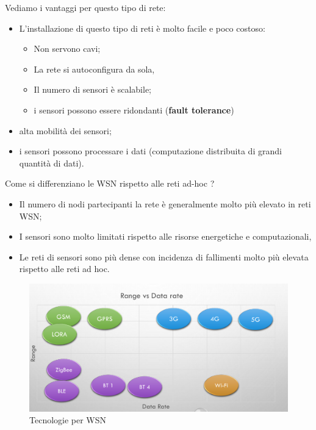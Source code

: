 \documentclass[12pt]{article}
\begin{document}
    		Vediamo i vantaggi per questo tipo di rete:
    		\begin{itemize}
    			\item L'installazione di questo tipo di reti è molto facile e poco costoso:
    			\begin{itemize}
    				\item Non servono cavi;
    				\item La rete si autoconfigura da sola,
    				\item Il numero di sensori è scalabile;
    				\item i sensori possono essere ridondanti (\textbf{fault tolerance})
    			\end{itemize}
    			\item alta mobilità dei sensori;
    			\item i sensori possono processare i dati (computazione distribuita di grandi quantità di dati).
    		\end{itemize}
    		Come si differenziano le WSN rispetto alle reti ad-hoc ?
    		\begin{itemize}
    			\item Il numero di nodi partecipanti la rete è generalmente molto più elevato in reti WSN;
    			\item I sensori sono molto limitati rispetto alle risorse energetiche e computazionali,
    			\item Le reti di sensori sono più dense con incidenza di fallimenti molto più elevata rispetto alle reti ad hoc.	
    		\end{itemize}
    		\begin{figure}[h!]
    			\centering
    			\includegraphics[scale=0.3]{img/wirel.png}
    			\caption{Tecnologie per WSN}
    		\end{figure}
\end{document}

